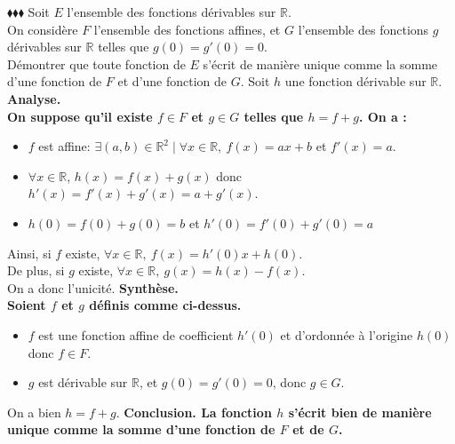 \documentclass[11pt]{article}
\begin{document}
\begin{exercice}{$\blacklozenge\blacklozenge\blacklozenge$}{}
    Soit $E$ l'ensemble des fonctions dérivables sur $\mathbb{R}$.\\
    On considère $F$ l'ensemble des fonctions affines, et $G$ l'ensemble des fonctions $g$ dérivables sur $\mathbb{R}$ telles que $g(0)=g'(0)=0$.\\
    Démontrer que toute fonction de $E$ s'écrit de manière unique comme la somme d'une fonction de $F$ et d'une fonction de $G$.
    \tcblower
    Soit $h$ une fonction dérivable sur $\mathbb{R}$.\n
    \bf{Analyse.}\\
    On suppose qu'il existe $f\in F$ et $g\in G$ telles que $h=f+g$. On a :
    \begin{itemize}
        \item $f$ est affine: $\exists(a,b)\in\mathbb{R}^2\mid\forall{x\in\mathbb{R}}, ~ f(x)=ax+b$ et $f'(x)=a$.  
        \item $\forall{x\in\mathbb{R}}$, $h(x)=f(x)+g(x)$ donc $h'(x)=f'(x)+g'(x)=a+g'(x)$.
        \item $h(0)=f(0)+g(0)=b$ et $h'(0)=f'(0)+g'(0)=a$
    \end{itemize}
    Ainsi, si $f$ existe, $\forall{x\in\mathbb{R}}, ~ f(x) = h'(0)x+h(0)$.\\
    De plus, si $g$ existe, $\forall{x\in\mathbb{R}}, ~ g(x) = h(x)-f(x)$.\\
    On a donc l'unicité.\n
    \bf{Synthèse.}\\
    Soient $f$ et $g$ définis comme ci-dessus.
    \begin{itemize}
        \item $f$ est une fonction affine de coefficient $h'(0)$ et d'ordonnée à l'origine $h(0)$ donc $f\in F$.
        \item $g$ est dérivable sur $\mathbb{R}$, et $g(0)=g'(0)=0$, donc $g\in G$. 
    \end{itemize}
    On a bien $h=f+g$.\n
    \bf{Conclusion.} La fonction $h$ s'écrit bien de manière unique comme la somme d'une fonction de $F$ et de $G$.
\end{exercice}
\end{document}
